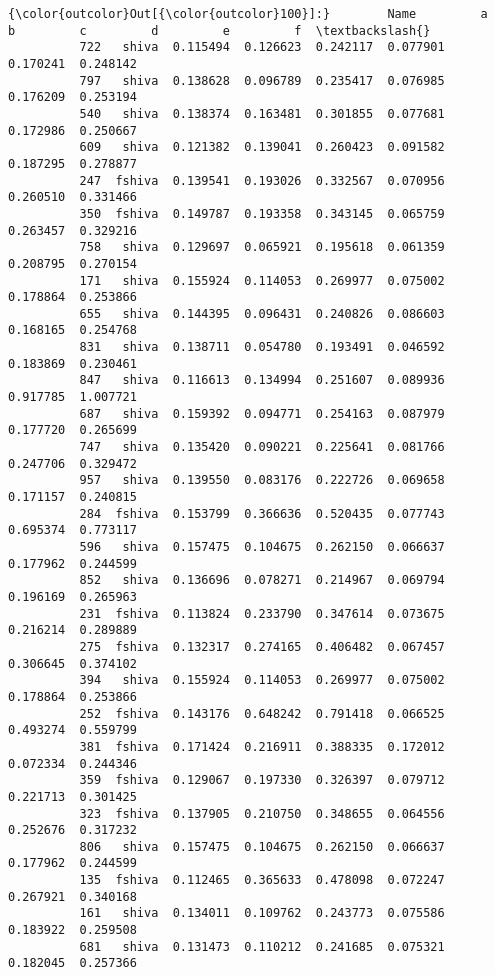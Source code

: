 \documentclass[11pt]{article}
\begin{document}
\begin{Verbatim}[commandchars=\\\{\}]
{\color{outcolor}Out[{\color{outcolor}100}]:}        Name         a         b         c         d         e         f  \textbackslash{}
          722   shiva  0.115494  0.126623  0.242117  0.077901  0.170241  0.248142   
          797   shiva  0.138628  0.096789  0.235417  0.076985  0.176209  0.253194   
          540   shiva  0.138374  0.163481  0.301855  0.077681  0.172986  0.250667   
          609   shiva  0.121382  0.139041  0.260423  0.091582  0.187295  0.278877   
          247  fshiva  0.139541  0.193026  0.332567  0.070956  0.260510  0.331466   
          350  fshiva  0.149787  0.193358  0.343145  0.065759  0.263457  0.329216   
          758   shiva  0.129697  0.065921  0.195618  0.061359  0.208795  0.270154   
          171   shiva  0.155924  0.114053  0.269977  0.075002  0.178864  0.253866   
          655   shiva  0.144395  0.096431  0.240826  0.086603  0.168165  0.254768   
          831   shiva  0.138711  0.054780  0.193491  0.046592  0.183869  0.230461   
          847   shiva  0.116613  0.134994  0.251607  0.089936  0.917785  1.007721   
          687   shiva  0.159392  0.094771  0.254163  0.087979  0.177720  0.265699   
          747   shiva  0.135420  0.090221  0.225641  0.081766  0.247706  0.329472   
          957   shiva  0.139550  0.083176  0.222726  0.069658  0.171157  0.240815   
          284  fshiva  0.153799  0.366636  0.520435  0.077743  0.695374  0.773117   
          596   shiva  0.157475  0.104675  0.262150  0.066637  0.177962  0.244599   
          852   shiva  0.136696  0.078271  0.214967  0.069794  0.196169  0.265963   
          231  fshiva  0.113824  0.233790  0.347614  0.073675  0.216214  0.289889   
          275  fshiva  0.132317  0.274165  0.406482  0.067457  0.306645  0.374102   
          394   shiva  0.155924  0.114053  0.269977  0.075002  0.178864  0.253866   
          252  fshiva  0.143176  0.648242  0.791418  0.066525  0.493274  0.559799   
          381  fshiva  0.171424  0.216911  0.388335  0.172012  0.072334  0.244346   
          359  fshiva  0.129067  0.197330  0.326397  0.079712  0.221713  0.301425   
          323  fshiva  0.137905  0.210750  0.348655  0.064556  0.252676  0.317232   
          806   shiva  0.157475  0.104675  0.262150  0.066637  0.177962  0.244599   
          135  fshiva  0.112465  0.365633  0.478098  0.072247  0.267921  0.340168   
          161   shiva  0.134011  0.109762  0.243773  0.075586  0.183922  0.259508   
          681   shiva  0.131473  0.110212  0.241685  0.075321  0.182045  0.257366   

\end{Verbatim}
\end{document}
